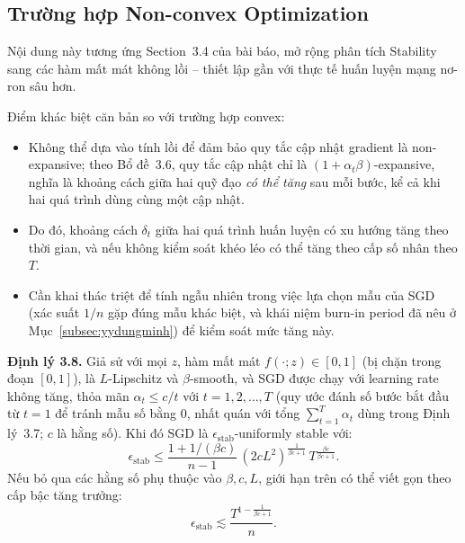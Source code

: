 \subsection{Trường hợp Non-convex Optimization}
\label{subsec:nonconvex}

Nội dung này tương ứng Section~3.4 của bài báo, mở rộng phân tích Stability sang các hàm mất mát không lồi -- thiết lập gần với thực tế huấn luyện mạng nơ-ron sâu hơn.

Điểm khác biệt căn bản so với trường hợp convex:
\begin{itemize}
    \item Không thể dựa vào tính lồi để đảm bảo quy tắc cập nhật gradient là non-expansive; theo Bổ đề~3.6, quy tắc cập nhật chỉ là $(1+\alpha_t\beta)$-expansive, nghĩa là khoảng cách giữa hai quỹ đạo \emph{có thể tăng} sau mỗi bước, kể cả khi hai quá trình dùng cùng một cập nhật.
    \item Do đó, khoảng cách $\delta_t$ giữa hai quá trình huấn luyện có xu hướng tăng theo thời gian, và nếu không kiểm soát khéo léo có thể tăng theo cấp số nhân theo $T$.
    \item Cần khai thác triệt để tính ngẫu nhiên trong việc lựa chọn mẫu của SGD (xác suất $1/n$ gặp đúng mẫu khác biệt, và khái niệm burn-in period đã nêu ở Mục~\ref{subsec:yydungminh}) để kiểm soát mức tăng này.
\end{itemize}

\textbf{Định lý 3.8.} Giả sử với mọi $z$, hàm mất mát $f(\cdot; z) \in [0, 1]$ (bị chặn trong đoạn $[0,1]$), là $L$-Lipschitz và $\beta$-smooth, và SGD được chạy với learning rate không tăng, thỏa mãn $\alpha_t \leq c/t$ với $t = 1, 2, \ldots, T$ (quy ước đánh số bước bắt đầu từ $t=1$ để tránh mẫu số bằng $0$, nhất quán với tổng $\sum_{t=1}^T \alpha_t$ dùng trong Định lý~3.7; $c$ là hằng số). Khi đó SGD là $\epsilon_{\mathrm{stab}}$-uniformly stable với:
\[
\boxed{
\epsilon_{\mathrm{stab}} \leq \frac{1 + 1/(\beta c)}{n - 1}\,(2cL^2)^{\frac{1}{\beta c + 1}}\, T^{\frac{\beta c}{\beta c + 1}}.
}
\]
Nếu bỏ qua các hằng số phụ thuộc vào $\beta, c, L$, giới hạn trên có thể viết gọn theo cấp bậc tăng trưởng:
\[
\epsilon_{\mathrm{stab}} \lesssim \frac{T^{1 - \frac{1}{\beta c + 1}}}{n}.
\]

